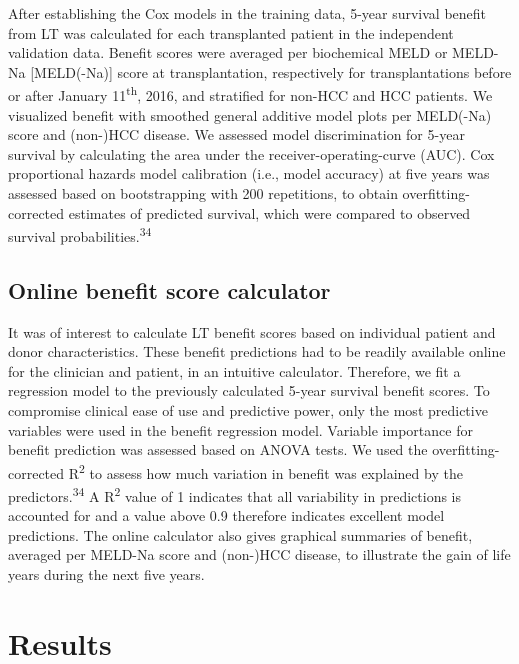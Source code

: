 \documentclass[11pt,english,]{book} %
\begin{document}
After establishing the Cox models in the training data, 5-year survival benefit from LT was calculated for each transplanted patient in the independent validation data. Benefit scores were averaged per biochemical MELD or MELD-Na {[}MELD(-Na){]} score at transplantation, respectively for transplantations before or after January 11\textsuperscript{th}, 2016, and stratified for non-HCC and HCC patients. We visualized benefit with smoothed general additive model plots per MELD(-Na) score and (non-)HCC disease. We assessed model discrimination for 5-year survival by calculating the area under the receiver-operating-curve (AUC). Cox proportional hazards model calibration (i.e., model accuracy) at five years was assessed based on bootstrapping with 200 repetitions, to obtain overfitting-corrected estimates of predicted survival, which were compared to observed survival probabilities.\textsuperscript{34}

\hypertarget{online-benefit-score-calculator}{%
\subsection*{Online benefit score calculator}\label{online-benefit-score-calculator}}

It was of interest to calculate LT benefit scores based on individual patient and donor characteristics. These benefit predictions had to be readily available online for the clinician and patient, in an intuitive calculator. Therefore, we fit a regression model to the previously calculated 5-year survival benefit scores. To compromise clinical ease of use and predictive power, only the most predictive variables were used in the benefit regression model. Variable importance for benefit prediction was assessed based on ANOVA tests. We used the overfitting-corrected R\textsuperscript{2} to assess how much variation in benefit was explained by the predictors.\textsuperscript{34} A R\textsuperscript{2} value of 1 indicates that all variability in predictions is accounted for and a value above 0.9 therefore indicates excellent model predictions. The online calculator also gives graphical summaries of benefit, averaged per MELD-Na score and (non-)HCC disease, to illustrate the gain of life years during the next five years.

\hypertarget{results-4}{%
\section*{Results}\label{results-4}}
\end{document}
